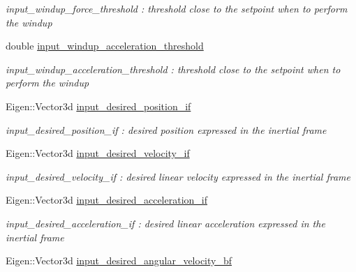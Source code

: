 \begin{DoxyCompactItemize}
\begin{DoxyCompactList}\small\item\em input\-\_\-windup\-\_\-force\-\_\-threshold \-: threshold close to the setpoint when to perform the windup \end{DoxyCompactList}\item 
\hypertarget{struct_skye_parameters_aea5e5b0e3fe3a67d3e60c3e65fb00546}{double \hyperlink{struct_skye_parameters_aea5e5b0e3fe3a67d3e60c3e65fb00546}{input\-\_\-windup\-\_\-acceleration\-\_\-threshold}}\label{struct_skye_parameters_aea5e5b0e3fe3a67d3e60c3e65fb00546}

\begin{DoxyCompactList}\small\item\em input\-\_\-windup\-\_\-acceleration\-\_\-threshold \-: threshold close to the setpoint when to perform the windup \end{DoxyCompactList}\item 
\hypertarget{struct_skye_parameters_a2a7f81ce2ec7d633f02c77060da8139c}{Eigen\-::\-Vector3d \hyperlink{struct_skye_parameters_a2a7f81ce2ec7d633f02c77060da8139c}{input\-\_\-desired\-\_\-position\-\_\-if}}\label{struct_skye_parameters_a2a7f81ce2ec7d633f02c77060da8139c}

\begin{DoxyCompactList}\small\item\em input\-\_\-desired\-\_\-position\-\_\-if \-: desired position expressed in the inertial frame \end{DoxyCompactList}\item 
\hypertarget{struct_skye_parameters_a9f3ba3a6ad434b885dd7ce76fbe9f7b4}{Eigen\-::\-Vector3d \hyperlink{struct_skye_parameters_a9f3ba3a6ad434b885dd7ce76fbe9f7b4}{input\-\_\-desired\-\_\-velocity\-\_\-if}}\label{struct_skye_parameters_a9f3ba3a6ad434b885dd7ce76fbe9f7b4}

\begin{DoxyCompactList}\small\item\em input\-\_\-desired\-\_\-velocity\-\_\-if \-: desired linear velocity expressed in the inertial frame \end{DoxyCompactList}\item 
\hypertarget{struct_skye_parameters_a931b644ebe7201095e350bf9a1ea1365}{Eigen\-::\-Vector3d \hyperlink{struct_skye_parameters_a931b644ebe7201095e350bf9a1ea1365}{input\-\_\-desired\-\_\-acceleration\-\_\-if}}\label{struct_skye_parameters_a931b644ebe7201095e350bf9a1ea1365}

\begin{DoxyCompactList}\small\item\em input\-\_\-desired\-\_\-acceleration\-\_\-if \-: desired linear acceleration expressed in the inertial frame \end{DoxyCompactList}\item 
\hypertarget{struct_skye_parameters_a92ab3db245b3e4e62f01f828a4838cdc}{Eigen\-::\-Vector3d \hyperlink{struct_skye_parameters_a92ab3db245b3e4e62f01f828a4838cdc}{input\-\_\-desired\-\_\-angular\-\_\-velocity\-\_\-bf}}\label{struct_skye_parameters_a92ab3db245b3e4e62f01f828a4838cdc}


\end{DoxyCompactItemize}
